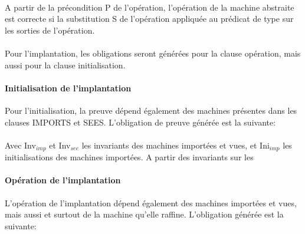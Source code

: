 \\

A partir de la précondition P de l'opération, l'opération de la machine
abstraite est correcte si la substitution S de l'opération appliquée au
prédicat de type sur les sorties de l'opération.

\paragraph{}
\noindent
Pour l'implantation, les obligations seront générées pour la clause opération,
mais aussi pour la clause initialisation. 

\paragraph{Initialisation de l'implantation} Pour l'initialisation, la preuve
dépend également des machines présentes dans les clauses IMPORTS et
SEES. L'obligation de preuve générée est la suivante:\\

 \\

Avec Inv$_{imp}$ et  Inv$_{see}$ les invariants des machines importées et vues,
et Ini$_{imp}$ les initialisations des machines importées. A partir des
invariants sur les 

\paragraph{Opération de l'implantation}
L'opération de l'implantation dépend également des machines importées et vues, mais
aussi et surtout de la machine qu'elle raffine. L'obligation générée est la
suivante:\\

\\




